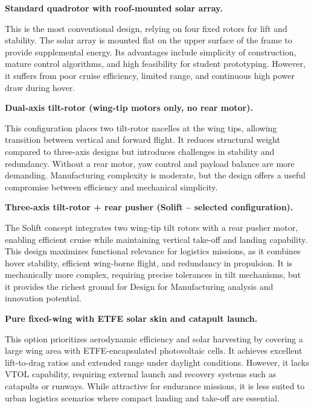 \begin{description}[noitemsep]
    \item[Option A] \textbf{Standard quadrotor with roof-mounted solar array.}   

    
    This is the most conventional design, relying on four fixed rotors for lift and stability. The solar array is mounted flat on the upper surface of the frame to provide supplemental energy. Its advantages include simplicity of construction, mature control algorithms, and high feasibility for student prototyping. However, it suffers from poor cruise efficiency, limited range, and continuous high power draw during hover.

    \item[Option B] \textbf{Dual-axis tilt-rotor (wing-tip motors only, no rear motor).}  


    
    This configuration places two tilt-rotor nacelles at the wing tips, allowing transition between vertical and forward flight. It reduces structural weight compared to three-axis designs but introduces challenges in stability and redundancy. Without a rear motor, yaw control and payload balance are more demanding. Manufacturing complexity is moderate, but the design offers a useful compromise between efficiency and mechanical simplicity.

    \item[Option C] \textbf{Three-axis tilt-rotor + rear pusher (Solift -- selected configuration).}  

    
    The Solift concept integrates two wing-tip tilt rotors with a rear pusher motor, enabling efficient cruise while maintaining vertical take-off and landing capability. This design maximizes functional relevance for logistics missions, as it combines hover stability, efficient wing-borne flight, and redundancy in propulsion. It is mechanically more complex, requiring precise tolerances in tilt mechanisms, but it provides the richest ground for Design for Manufacturing analysis and innovation potential.

    \item[Option D] \textbf{Pure fixed-wing with ETFE solar skin and catapult launch.}  

    
    This option prioritizes aerodynamic efficiency and solar harvesting by covering a large wing area with ETFE-encapsulated photovoltaic cells. It achieves excellent lift-to-drag ratios and extended range under daylight conditions. However, it lacks VTOL capability, requiring external launch and recovery systems such as catapults or runways. While attractive for endurance missions, it is less suited to urban logistics scenarios where compact landing and take-off are essential.
\end{description}


